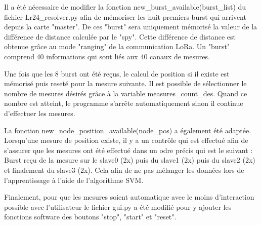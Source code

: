 Il a été nécessaire de modifier la fonction new\_burst\_available(burst\_list) du fichier Lr24\_resolver.py afin de mémoriser les huit premiers burst qui arrivent depuis la carte "master". De ces "burst" sera uniquement mémorisé la valeur de la différence de distance calculée par le "spy". Cette différence de distance est obtenue grâce au mode "ranging" de la communication LoRa. Un "burst" comprend 40 informations qui sont liés aux 40 canaux de mesures. 

Une fois que les 8 burst ont été reçus, le calcul de position si il existe est mémorisé puis reseté pour la mesure suivante. Il est possible de sélectionner le nombre de mesures désirés grâce à la variable measures\_count\_des. Quand ce nombre est atteint, le programme s'arrête automatiquement sinon il continue d'effectuer les mesures.

La fonction new\_node\_position\_available(node\_pos) a également été adaptée. Lorsqu'une mesure de position existe, il y a un contrôle qui est effectué afin de s'assurer que les mesures ont été effectué dans un odre précis qui est le suivant : Burst reçu de la mesure sur le slave0 (2x) puis du slave1 (2x) puis du slave2 (2x) et finalement du slave3 (2x). Cela afin de ne pas mélanger les données lors de l'apprentissage à l'aide de l'algorithme SVM. 

Finalement, pour que les mesures soient automatique avec le moins d'interaction possible avec l'utilisateur le fichier gui.py a été modifié pour y ajouter les fonctions software des boutons "stop", "start" et "reset". 

